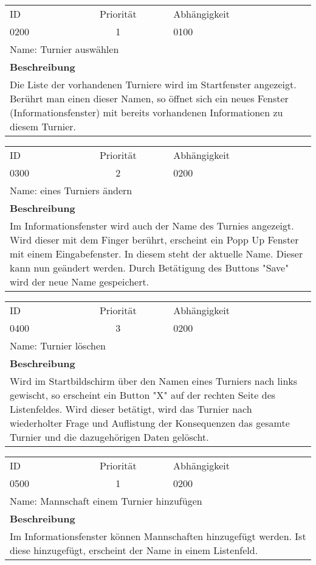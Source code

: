	\begin{tabularx}{\textwidth}{|l|c|l|}
		\hline
		ID & Priorität & Abhängigkeit \\
		0200 & 1 & 0100\\
		\hline
		\multicolumn{3}{|l|}{Name: Turnier auswählen} \\
		\hline
		\multicolumn{3}{|l|}{\textbf{Beschreibung}}\\
		\multicolumn{3}{|X|}{Die Liste der vorhandenen Turniere wird im Startfenster angezeigt. Berührt man einen dieser Namen, so öffnet sich ein neues Fenster (Informationsfenster) mit bereits vorhandenen Informationen zu diesem Turnier.}\\
		\hline		 
	\end{tabularx}
	
	\begin{tabularx}{\textwidth}{|l|c|l|}
		\hline
		ID & Priorität & Abhängigkeit \\
		0300 & 2 & 0200\\
		\hline
		\multicolumn{3}{|l|}{Name: eines Turniers ändern} \\
		\hline
		\multicolumn{3}{|l|}{\textbf{Beschreibung}}\\
		\multicolumn{3}{|X|}{Im Informationsfenster wird auch der Name des Turnies angezeigt. Wird dieser mit dem Finger berührt, erscheint ein Popp Up Fenster mit einem Eingabefenster. In diesem steht der aktuelle Name. Dieser kann nun geändert werden. Durch Betätigung des Buttons "Save" wird der neue Name gespeichert.}\\
		\hline		 
	\end{tabularx}
	
	\begin{tabularx}{\textwidth}{|l|c|l|}
		\hline
		ID & Priorität & Abhängigkeit \\
		0400 & 3 & 0200\\
		\hline
		\multicolumn{3}{|l|}{Name: Turnier löschen} \\
		\hline
		\multicolumn{3}{|l|}{\textbf{Beschreibung}}\\
		\multicolumn{3}{|X|}{Wird im Startbildschirm über den Namen eines Turniers nach links gewischt, so erscheint ein Button "X" auf der rechten Seite des Listenfeldes. Wird dieser betätigt, wird das Turnier nach wiederholter Frage und Auflistung der Konsequenzen das gesamte Turnier und die dazugehörigen Daten gelöscht.}\\
		\hline		 
	\end{tabularx}
	
	\begin{tabularx}{\textwidth}{|l|c|l|}
		\hline
		ID & Priorität & Abhängigkeit \\
		0500 & 1 & 0200\\
		\hline
		\multicolumn{3}{|l|}{Name: Mannschaft einem Turnier hinzufügen} \\
		\hline
		\multicolumn{3}{|l|}{\textbf{Beschreibung}}\\
		\multicolumn{3}{|X|}{Im Informationsfenster können Mannschaften hinzugefügt werden. Ist diese hinzugefügt, erscheint der Name in einem Listenfeld.}\\
		\hline		 
	\end{tabularx}
	
